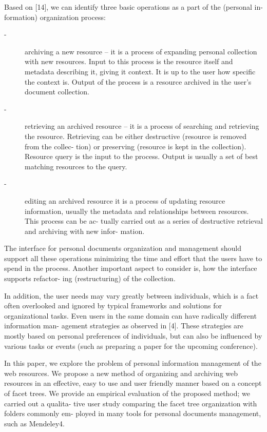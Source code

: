 \documentclass{llncs}
\begin{document}
Based on [14], we can identify three basic operations as a part of the (personal in- formation) organization process:

\begin{description}
	
\item [-] archiving a new resource – it is a process of expanding personal collection with new resources. Input to this process is the resource itself and metadata describing it, giving it context. It is up to the user how specific the context is. Output of the process is a resource archived in the user’s document collection.
\item [-] retrieving an archived resource – it is a process of searching and retrieving the resource. Retrieving can be either destructive (resource is removed from the collec- tion) or preserving (resource is kept in the collection). Resource query is the input to the process. Output is usually a set of best matching resources to the query.

\item [-] editing an archived resource it is a process of updating resource information, usually the metadata and relationships between resources. This process can be ac- tually carried out as a series of destructive retrieval and archiving with new infor- mation.

\end{description}

The interface for personal documents organization and management should support all these operations minimizing the time and effort that the users have to spend in the process. Another important aspect to consider is, how the interface supports refactor- ing (restructuring) of the collection.

In addition, the user needs may vary greatly between individuals, which is a fact often overlooked and ignored by typical frameworks and solutions for organizational tasks. Even users in the same domain can have radically different information man- agement strategies as observed in [4]. These strategies are mostly based on personal preferences of individuals, but can also be influenced by various tasks or events (such as preparing a paper for the upcoming conference).

In this paper, we explore the problem of personal information management of the web resources. We propose a new method of organizing and archiving web resources in an effective, easy to use and user friendly manner based on a concept of facet trees. We provide an empirical evaluation of the proposed method; we carried out a qualita- tive user study comparing the facet tree organization with folders commonly em- ployed in many tools for personal documents management, such as Mendeley4.
\end{document}
